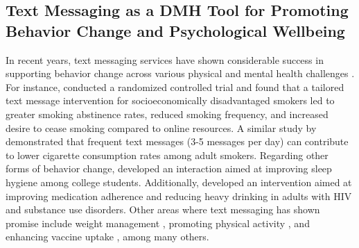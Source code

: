 \subsection{Text Messaging as a DMH Tool for Promoting
Behavior Change and Psychological Wellbeing}
In recent years, text messaging services have shown considerable success in supporting behavior change across various physical and mental health challenges \cite{haug2013efficacy, haug2013pre, yun2013text, suffoletto2023effectiveness, shalaby2022text, figueroa2022daily, bhandari2022effectiveness, villanti2022tailored, gipson2019effects}. For instance, \citet{villanti2022tailored} conducted a randomized controlled trial and found that a tailored text message intervention for socioeconomically disadvantaged smokers led to greater smoking abstinence rates, reduced smoking frequency, and increased desire to cease smoking compared to online resources. A similar study by \citet{liao2018effectiveness} demonstrated that frequent text messages (3-5 messages per day) can contribute to lower cigarette consumption rates among adult smokers. 
Regarding other forms of behavior change, \cite{gipson2019effects} developed an interaction aimed at improving sleep hygiene among college students. 
Additionally, \citet{glasner2022promising} developed an intervention aimed at improving medication adherence and reducing heavy drinking in adults with HIV and substance use disorders. 
Other areas where text messaging has shown promise include weight management \cite{siopis2015systematic, donaldson2014text}, promoting physical activity \cite{kim2013text, smith2020text, murnane2020designing}, and enhancing vaccine uptake \cite{buttenheim2022effects, mehta2022effect}, among many others.

